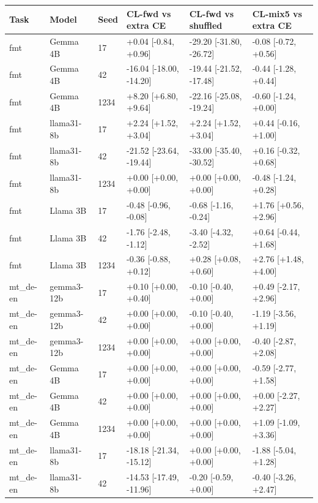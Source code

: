 \begin{table}[t]
\centering\small
\begin{tabular}{llllll}
\toprule
Task & Model & Seed & CL-fwd vs extra CE & CL-fwd vs shuffled & CL-mix5 vs extra CE \\
\midrule
fmt & Gemma 4B & 17 & +0.04 [-0.84, +0.96] & -29.20 [-31.80, -26.72] & -0.08 [-0.72, +0.56] \\
fmt & Gemma 4B & 42 & -16.04 [-18.00, -14.20] & -19.44 [-21.52, -17.48] & -0.44 [-1.28, +0.44] \\
fmt & Gemma 4B & 1234 & +8.20 [+6.80, +9.64] & -22.16 [-25.08, -19.24] & -0.60 [-1.24, +0.00] \\
fmt & llama31-8b & 17 & +2.24 [+1.52, +3.04] & +2.24 [+1.52, +3.04] & +0.44 [-0.16, +1.00] \\
fmt & llama31-8b & 42 & -21.52 [-23.64, -19.44] & -33.00 [-35.40, -30.52] & +0.16 [-0.32, +0.68] \\
fmt & llama31-8b & 1234 & +0.00 [+0.00, +0.00] & +0.00 [+0.00, +0.00] & -0.48 [-1.24, +0.28] \\
fmt & Llama 3B & 17 & -0.48 [-0.96, -0.08] & -0.68 [-1.16, -0.24] & +1.76 [+0.56, +2.96] \\
fmt & Llama 3B & 42 & -1.76 [-2.48, -1.12] & -3.40 [-4.32, -2.52] & +0.64 [-0.44, +1.68] \\
fmt & Llama 3B & 1234 & -0.36 [-0.88, +0.12] & +0.28 [+0.08, +0.60] & +2.76 [+1.48, +4.00] \\
mt\_de-en & gemma3-12b & 17 & +0.10 [+0.00, +0.40] & -0.10 [-0.40, +0.00] & +0.49 [-2.17, +2.96] \\
mt\_de-en & gemma3-12b & 42 & +0.00 [+0.00, +0.00] & -0.10 [-0.40, +0.00] & -1.19 [-3.56, +1.19] \\
mt\_de-en & gemma3-12b & 1234 & +0.00 [+0.00, +0.00] & +0.00 [+0.00, +0.00] & -0.40 [-2.87, +2.08] \\
mt\_de-en & Gemma 4B & 17 & +0.00 [+0.00, +0.00] & +0.00 [+0.00, +0.00] & -0.59 [-2.77, +1.58] \\
mt\_de-en & Gemma 4B & 42 & +0.00 [+0.00, +0.00] & +0.00 [+0.00, +0.00] & +0.00 [-2.27, +2.27] \\
mt\_de-en & Gemma 4B & 1234 & +0.00 [+0.00, +0.00] & +0.00 [+0.00, +0.00] & +1.09 [-1.09, +3.36] \\
mt\_de-en & llama31-8b & 17 & -18.18 [-21.34, -15.12] & +0.00 [+0.00, +0.00] & -1.88 [-5.04, +1.28] \\
mt\_de-en & llama31-8b & 42 & -14.53 [-17.49, -11.96] & -0.20 [-0.59, +0.00] & -0.40 [-3.26, +2.47] \\

\end{tabular}
\end{table}
